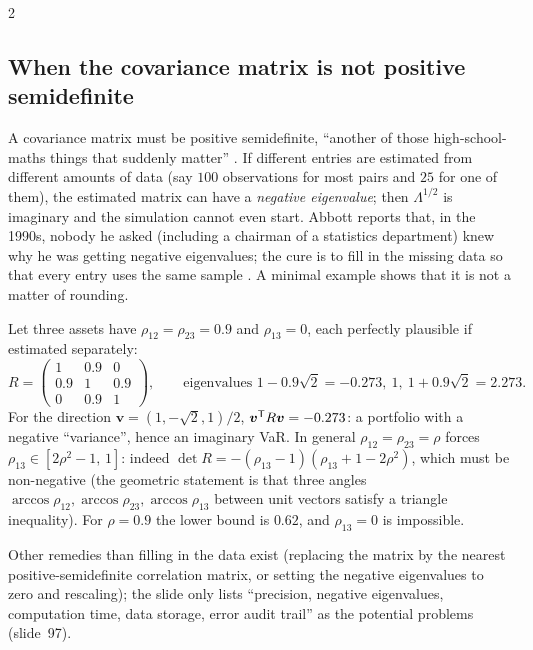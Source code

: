 \begin{paracol}{2}
\subsection{When the covariance matrix is not positive semidefinite}
A covariance matrix must be positive semidefinite, ``another of those high-school-maths things that suddenly matter'' . If different entries are estimated from different amounts of data (say $100$ observations for most pairs and $25$ for one of them), the estimated matrix can have a \emph{negative eigenvalue}; then $\Lambda^{1/2}$ is imaginary and the simulation cannot even start. Abbott reports that, in the 1990s, nobody he asked (including a chairman of a statistics department) knew why he was getting negative eigenvalues; the cure is to fill in the missing data so that every entry uses the same sample . A minimal example shows that it is not a matter of rounding.

\begin{example}\label{ch19:ex-psd}
Let three assets have $\rho_{12}=\rho_{23}=0.9$ and $\rho_{13}=0$, each perfectly plausible if estimated separately:
\[
  R=\begin{pmatrix}1&0.9&0\\0.9&1&0.9\\0&0.9&1\end{pmatrix},\qquad\text{eigenvalues }1-0.9\sqrt2=-0.273,\ 1,\ 1+0.9\sqrt2=2.273 .
\]
For the direction $\bm v=(1,-\sqrt2,1)/2$, $\bm v^{\mathsf T} R\bm v=-0.273$: a portfolio with a negative ``variance'', hence an imaginary VaR. In general $\rho_{12}=\rho_{23}=\rho$ forces $\rho_{13}\in[2\rho^2-1,\,1]$: indeed $\det R=-(\rho_{13}-1)(\rho_{13}+1-2\rho^2)$, which must be non-negative (the geometric statement is that three angles $\arccos\rho_{12},\arccos\rho_{23},\arccos\rho_{13}$ between unit vectors satisfy a triangle inequality). For $\rho=0.9$ the lower bound is $0.62$, and $\rho_{13}=0$ is impossible.
\end{example}
Other remedies than filling in the data exist (replacing the matrix by the nearest positive-semidefinite correlation matrix, or setting the negative eigenvalues to zero and rescaling); the slide only lists ``precision, negative eigenvalues, computation time, data storage, error audit trail'' as the potential problems (slide~97).


\end{paracol}
